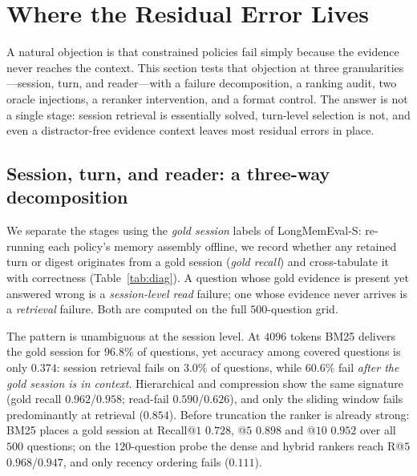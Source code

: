\documentclass{article} %
\begin{document}
\section{Where the Residual Error Lives}
\label{sec:reading}
A natural objection is that constrained policies fail simply because the evidence never
reaches the context. This section tests that objection at three granularities---session,
turn, and reader---with a failure decomposition, a ranking audit, two oracle injections, a
reranker intervention, and a format control. The answer is not a single stage: session
retrieval is essentially solved, turn-level selection is not, and even a distractor-free
evidence context leaves most residual errors in place.

\subsection{Session, turn, and reader: a three-way decomposition}
\label{sec:diag}
We separate the stages using the \emph{gold session} labels of LongMemEval-S:
re-running each policy's memory assembly offline, we record whether any retained turn or
digest originates from a gold session (\emph{gold recall}) and cross-tabulate it with
correctness (Table~\ref{tab:diag}). A question whose gold evidence is present yet answered
wrong is a \emph{session-level read} failure; one whose evidence never arrives is a
\emph{retrieval} failure. Both are computed on the full $500$-question grid.

\begin{table}[h]
\centering\scriptsize
\caption{Failure localization on the full grid ($n{=}500$; two operating points per policy).
\emph{gold recall}: share of questions whose gold session reaches the context;
\emph{acc$|_{\mathrm{covered}}$}: accuracy restricted to those questions;
\emph{read-fail}/\emph{retr.-fail}: shares of \emph{all} questions failing with and without
gold-session coverage (they sum with accuracy to one). Source
\texttt{tables500/diag.tex}.}
\label{tab:diag}

\end{table}

The pattern is unambiguous at the session level. At $4096$ tokens BM25 delivers the gold
session for $96.8\%$ of questions, yet accuracy among covered questions is only $0.374$:
session retrieval fails on $3.0\%$ of questions, while $60.6\%$ fail \emph{after the gold
session is in context}. Hierarchical and compression show the same signature (gold recall
$0.962$/$0.958$; read-fail $0.590$/$0.626$), and only the sliding window fails
predominantly at retrieval ($0.854$). Before truncation the ranker is already strong: BM25
places a gold session at Recall@$1$ $0.728$, @$5$ $0.898$ and @$10$ $0.952$ over all $500$
questions; on the $120$-question probe the dense and hybrid rankers reach R@$5$
$0.968$/$0.947$, and only recency ordering fails ($0.111$).
\end{document}
